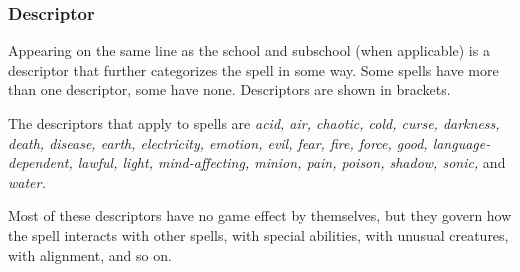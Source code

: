 \documentclass[../VancianToPsionics.tex]{subfiles}
\begin{document}
\begin{comment}
\subparagraph{Polymorph:}
Some Transmutation spells change the subject's form into that of another creature entirely.
When under a Polymorph subschool spell, the subject loses most of its racial features.
Of its racial features, the subject retains its bonus feats, bonus skill points, skill bonuses, and racial weapon proficiencies. All other racial features are lost.
It retains its own type and subtypes.
Unless otherwise noted, its ability scores and natural armor bonus are unchanged from that of its natural form. It retains its ability to speak unless the new form has no organs capable of supporting speech (assume that animalistic mouths are sufficient for providing speech).
Magic items and articles of clothing not feasibly capable of being worn, held or carried by the new form meld into the subject's body, continuing to provide their benefits if applicable.
A creature can never be the subject of more than one Polymorph spell simultaneously. If multiple Polymorph spells are cast on a creature in succession, the older spells are suppressed while the newest is in effect.
Recognizing that a creature is under a Polymorph spell (rather than being a normal, average member of the creature type the subject morphed into) is generally a DC 20 spot check, or DC
15 for members of the creature type that the subject morphed into.
Your hit point total never changes as a result of a Polymorph subschool spell, even if your new form has a Constitution score different from your own.
\end{comment}

\subsubsection{Descriptor}
Appearing on the same line as the school and subschool (when applicable) is a descriptor that further categorizes the spell in some way. 
Some spells have more than one descriptor, some have none. Descriptors are shown in brackets.

The descriptors that apply to spells are 
\emph{acid, air, chaotic, cold, curse, darkness, death, disease, earth, electricity, emotion, evil, fear, fire, force, good, language-dependent, lawful, light, mind-affecting, minion, pain, poison, shadow, sonic,} and \emph{water.} 

Most of these descriptors have no game effect by themselves, but they govern how the spell interacts with other spells, with special abilities, with unusual creatures, with alignment, and so on.
\end{document}
